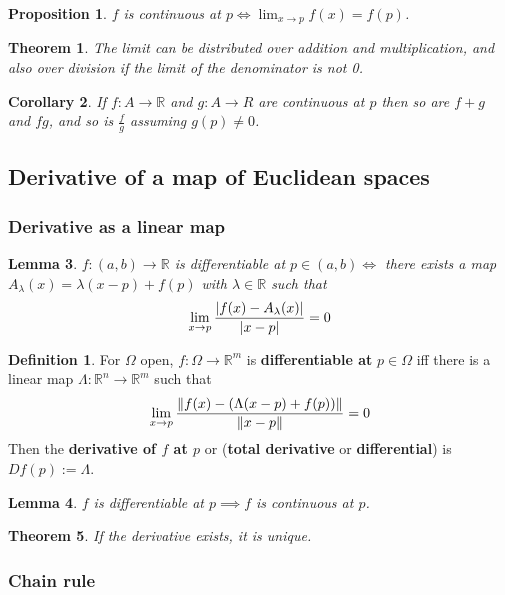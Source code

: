 \documentclass[12pt]{article}
\newtheorem{thm}{Theorem}[section]
\newtheorem{lem}[thm]{Lemma}
\newtheorem{cor}[thm]{Corollary}
\newtheorem*{prop*}{Proposition}
\theoremstyle{definition}
\newtheorem{defn}{Definition}[section]
\DeclarePairedDelimiter\abs{\lvert}{\rvert}
\DeclarePairedDelimiter\length{\lVert}{\rVert}
\newcommand{\R}{\mathbb{R}}
\begin{document}
\begin{prop*}
  $f$ is continuous at $p \iff \lim_{x \to p}f(x) = f(p)$.
\end{prop*}

\begin{thm}
  The limit can be distributed over addition and multiplication, and also over division if the limit of the denominator is not 0.
\end{thm}

\begin{cor}
  If $f : A \to \R$ and $g : A \to R$ are continuous at $p$ then so are $f + g$ and $fg$, and so is $\frac{f}{g}$ assuming $g(p) \neq 0$.
\end{cor}

\subsection{Derivative of a map of Euclidean spaces}

\subsubsection{Derivative as a linear map}

\begin{lem}
  $f : (a, b) \to \R$ is differentiable at $p \in (a, b) \iff$ there exists a map $A_{\lambda}(x) = \lambda(x - p) + f(p)$ with $\lambda \in \R$ such that
  $$\lim_{x \to p}\frac{\abs{f(x) - A_{\lambda}(x)}}{\abs{x - p}} = 0$$
\end{lem}

\begin{defn}
  For $\Omega$ open, $f : \Omega \to \R^m$ is \textbf{differentiable at} $p \in \Omega$ iff there is a linear map $\Lambda : \R^n \to \R^m$ such that
  $$\lim_{x \to p}\frac{\length{f(x) - (\Lambda(x - p) + f(p))}}{\length{x - p}} = 0$$
  Then the \textbf{derivative of $f$ at $p$} or (\textbf{total derivative} or \textbf{differential}) is $Df(p) := \Lambda$.
\end{defn}

\begin{lem}
  $f$ is differentiable at $p \implies f$ is continuous at $p$.
\end{lem}

\begin{thm}
  If the derivative exists, it is unique.
\end{thm}

\subsubsection{Chain rule}
\end{document}
